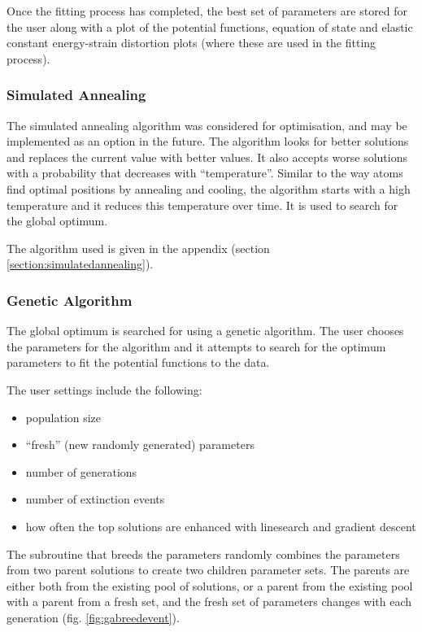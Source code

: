 Once the fitting process has completed, the best set of parameters are stored for the user along with a plot of the potential functions, equation of state and elastic constant energy-strain distortion plots (where these are used in the fitting process).





\subsubsection{Simulated Annealing}

The simulated annealing algorithm was considered for optimisation, and may be implemented as an option in the future.  The algorithm looks for better solutions and replaces the current value with better values.  It also accepts worse solutions with a probability that decreases with \enquote{temperature}.  Similar to the way atoms find optimal positions by annealing and cooling, the algorithm starts with a high temperature and it reduces this temperature over time.  It is used to search for the global optimum.

The algorithm used is given in the appendix (section \ref{section:simulatedannealing}).




\subsubsection{Genetic Algorithm}

The global optimum is searched for using a genetic algorithm.  The user chooses the parameters for the algorithm and it attempts to search for the optimum parameters to fit the potential functions to the data.

The user settings include the following:

\begin{itemize}
\item population size
\item \enquote{fresh} (new randomly generated) parameters
\item number of generations
\item number of extinction events
\item how often the top solutions are enhanced with linesearch and gradient descent
\end{itemize}

The subroutine that breeds the parameters randomly combines the parameters from two parent solutions to create two children parameter sets.  The parents are either both from the existing pool of solutions, or a parent from the existing pool with a parent from a fresh set, and the fresh set of parameters changes with each generation (fig. \ref{fig:gabreedevent}).

